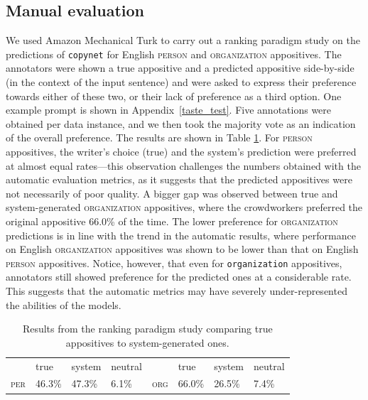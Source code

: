 \documentclass[11pt]{article}
\newcommand{\jttodo}[1]{\todo[color=blue!20]{#1}}
\begin{document}
\subsection{Manual evaluation}
We used Amazon Mechanical Turk to carry out a ranking paradigm study on the predictions of \texttt{copynet} for English \textsc{person} and \textsc{organization} appositives. The annotators were shown a true appositive and a predicted appositive side-by-side (in the context of the input sentence) and were asked to express their preference towards either of these two, or their lack of preference as a third option. One example prompt is shown in Appendix~\ref{taste_test}. Five annotations were obtained per data instance, and we then took the majority vote as an indication of the overall preference. %
The results are shown in Table \ref{tab:manual_eval}.  
For  \textsc{person} appositives, the writer's choice (true) and the system's prediction 
were preferred at almost equal rates---this observation challenges the numbers obtained with the automatic evaluation metrics, as it suggests that the predicted appositives were not necessarily of poor quality. A bigger gap was observed between true and system-generated \textsc{organization} appositives, where the crowdworkers preferred the original appositive 66.0\% of the time. The lower preference for \textsc{organization} predictions is in line with the trend in the automatic results, where performance on English \textsc{organization} appositives was shown to be lower than that on English \textsc{person} appositives.  Notice, however, that even for \texttt{organization} appositives, annotators still showed preference for the predicted ones at a considerable rate. This suggests that the automatic metrics may have severely under-represented the abilities of the models. 



\begin{table}[]
    \centering
    \small
    \begin{tabular}{llllllll}
         & true & system & neutral && true & system & neutral \\
         \textsc{per}& 46.3\% & 47.3\% & 6.1\%  & \textsc{org}& 66.0\% & 26.5\% & 7.4\% \\
         
    \end{tabular}
   \caption{Results from the ranking paradigm study comparing true appositives to system-generated ones.}
    \label{tab:manual_eval}
\end{table}
\end{document}

